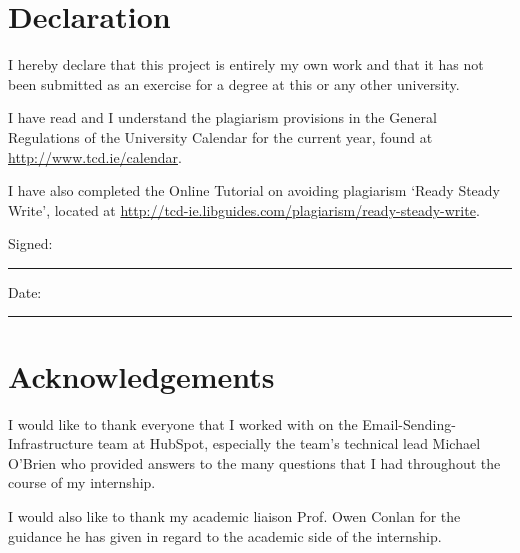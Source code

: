 \section*{\Huge{Declaration}}
\vspace{1cm}
I hereby declare that this project is entirely my own work and that it has not been submitted as an exercise for a degree at this or any other university.

\vspace{1cm}
I have read and I understand the plagiarism provisions in the General Regulations of the University Calendar for the current year, found at \url{http://www.tcd.ie/calendar}.
\vspace{1cm}

I have also completed the Online Tutorial on avoiding plagiarism `Ready Steady Write', located at
\url{http://tcd-ie.libguides.com/plagiarism/ready-steady-write}.
\vspace{3cm}

Signed:~\rule{5cm}{0.3pt}\hfill Date:~\rule{5cm}{0.3pt}

\newpage
\onehalfspacing
\raggedright %

\section*{\Huge{Acknowledgements}}
I would like to thank everyone that I worked with on the Email-Sending-Infrastructure team at HubSpot, especially the team's technical lead Michael O'Brien who provided answers to the many questions that I had throughout the course of my internship.


I would also like to thank my academic liaison Prof. Owen Conlan for the guidance he has given in regard to the academic side of the internship.

\tableofcontents
\listoffigures
\listoftables
\lstlistoflistings
\newpage



